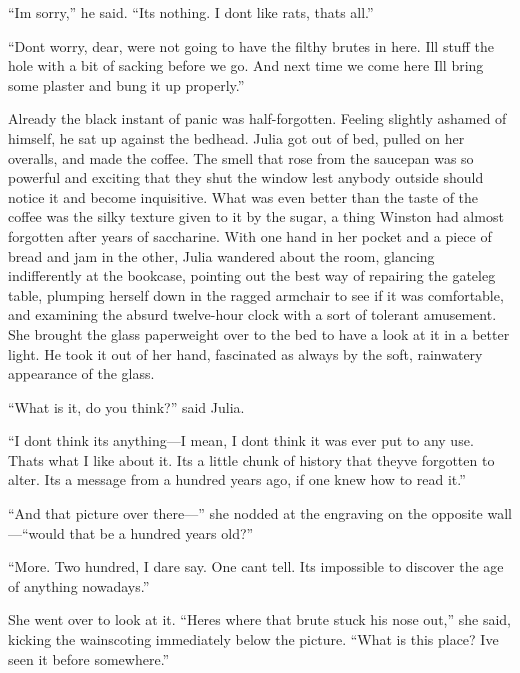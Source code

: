 ``I\textquotesingle m sorry,'' he said. ``It\textquotesingle s nothing. I
don\textquotesingle t like rats, that\textquotesingle s all.''

``Don\textquotesingle t worry, dear, we\textquotesingle re not going to
have the filthy brutes in here. I\textquotesingle ll stuff the hole with
a bit of sacking before we go. And next time we come here
I\textquotesingle ll bring some plaster and bung it up properly.''

Already the black instant of panic was half-forgotten. Feeling slightly
ashamed of himself, he sat up against the bedhead. Julia got out of bed,
pulled on her overalls, and made the coffee. The smell that rose from
the saucepan was so powerful and exciting that they shut the window lest
anybody outside should notice it and become inquisitive. What was even
better than the taste of the coffee was the silky texture given to it by
the sugar, a thing Winston had almost forgotten after years of
saccharine. With one hand in her pocket and a piece of bread and jam in
the other, Julia wandered about the room, glancing indifferently at the
bookcase, pointing out the best way of repairing the gateleg table,
plumping herself down in the ragged armchair to see if it was
comfortable, and examining the absurd twelve-hour clock with a sort of
tolerant amusement. She brought the glass paperweight over to the bed to
have a look at it in a better light. He took it out of her hand,
fascinated as always by the soft, rainwatery appearance of the glass.

``What is it, do you think?'' said Julia.

``I don\textquotesingle t think it\textquotesingle s anything---I mean, I
don\textquotesingle t think it was ever put to any use.
That\textquotesingle s what I like about it. It\textquotesingle s a
little chunk of history that they\textquotesingle ve forgotten to alter.
It\textquotesingle s a message from a hundred years ago, if one knew how
to read it.''

``And that picture over there---'' she nodded at the engraving on the
opposite wall---``would that be a hundred years old?''

``More. Two hundred, I dare say. One can\textquotesingle t tell.
It\textquotesingle s impossible to discover the age of anything
nowadays.''

She went over to look at it. ``Here\textquotesingle s where that brute
stuck his nose out,'' she said, kicking the wainscoting immediately below
the picture. ``What is this place? I\textquotesingle ve seen it before
somewhere.''

